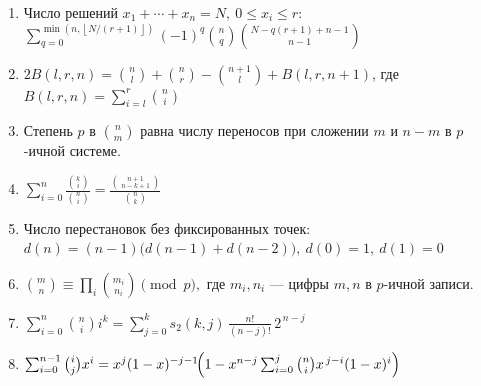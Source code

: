 \begin{enumerate}
$F+G,\quad d_F=d_G:\qquad c_i=c_i^F+c_i^G$

$F\!\cdot\!G:\quad D=d_F+d_G-1,\qquad
h_d(r)=[r\ge0]\binom{r+d-1}{d-1}$


$\nxt{c}_i=\sum_{j=0}^{i-1}(-1)^j\binom{D}{j}p_{i-j},\qquad
\nxt{d}=D\quad(1\le i\le D)$

$f,\ g,\ \nxt{c}\text{ считаются тремя NTT-свёртками}$

\item %
Число решений $x_1+\cdots+x_n=N,\ 0\le x_i\le r$:
\\ $\displaystyle \sum_{q=0}^{\min\left(n,\left\lfloor N/(r+1)\right\rfloor\right)}(-1)^q\binom{n}{q}\binom{N-q(r+1)+n-1}{n-1}$

\item %
$2B(l,r,n) = \binom{n}{l} + \binom{n}{r} - \binom{n+1}{l} + B(l, r, n+1)$, где $B(l, r, n) = \sum_{i=l}^r \binom{n}{i}$

\item %
Степень $p$ в $\binom{n}{m}$ равна числу переносов при сложении $m$ и $n-m$ в $p$-ичной системе.

\item %
$\sum_{i=0}^{n}\frac{\binom{k}{i}}{\binom{n}{i}}
=\frac{\binom{n+1}{\,n-k+1\,}}{\binom{n}{k}}$

\item %
Число перестановок без фиксированных точек: \\ $d(n)=(n-1)\bigl(d(n-1)+d(n-2)\bigr),\  d(0)=1,\ d(1)=0$

\item %
$\binom{m}{n}\equiv\prod_i\binom{m_i}{n_i}\pmod p,$
\quad где $m_i,n_i$ — цифры $m,n$ в $p$-ичной записи.

\item %
$\sum_{i=0}^{n}\binom{n}{i}i^k
=\sum_{j=0}^{k}s_2(k,j)\,\frac{n!}{(n-j)!}\,2^{\,n-j}$

\item %
$\sum_{i=0}^{n-1}\binom{i}{j}x^i
= x^j(1-x)^{-j-1}\!\Bigl(1-x^{n-j}\sum_{i=0}^j\binom{n}{i}x^{\,j-i}(1-x)^i\Bigr)$


\end{enumerate}
